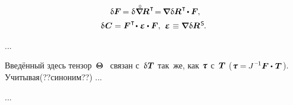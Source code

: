 \begin{otherlanguage}{russian}
\begin{equation}
\begin{array}{c}
\:\,
\variation{\bm{F}} \hspace{-0.2ex} = \variation{\hspace{.1ex} \boldnablacircled \hspace{-0.16ex} \bm{R}^{\hspace{0.12ex}\T}} \hspace{-0.4ex}
= \hspace{-0.2ex} \boldnabla \hspace{.1ex} \variation{\bm{R}}^{\hspace{0.12ex}\T} \hspace{-0.25ex} \dotp \bm{F} \hspace{-0.1ex},
\\[.5em]
%
\variation{\hspace{.12ex}\bm{C}} = \bm{F}^{\hspace{.1ex}\T} \hspace{-0.32ex} \dotp \hspace{.1ex} \mathboldepsilon \dotp \bm{F} ,
\:\,
\mathboldepsilon \hspace{0.1ex} \equiv \boldnabla \hspace{.1ex} \variation{\bm{R}}^{\hspace{0.2ex}\mathsf{S}} \hspace{-0.2ex} .
\end{array}
\end{equation}

...

Введённый здесь тензор~$\bm{\Theta}$~\cite{lurie-nonlinearelasticity} связан с~$\variation{\hspace{.1ex}\firstpiolakirchhoffstress}$ так~же, как $\cauchystress$ с~$\bm{T}$ (${\cauchystress = \hspace{-0.1ex} J^{\hspace{.12ex}\expminusone} \bm{F} \dotp \hspace{.16ex} \firstpiolakirchhoffstress\hspace{.2ex}}$). Учитывая(??синоним??) ...

...







\end{otherlanguage}
